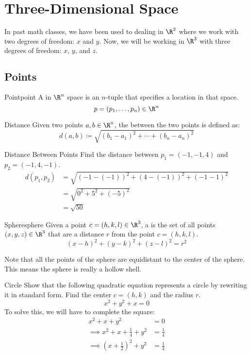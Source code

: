 \chapter{Three-Dimensional Space}
In past math classes, we have been used to dealing in $\R^2$ where we work with two degrees of freedom: $x$ and $y$. Now, we will be working in $\R^3$ with three degrees of freedom: $x$, $y$, and $z$.

\section{Points}

\begin{dfnbox}{Point}{point}
    A  in $\R^n$ space is an $n$-tuple that specifies a location in that space.
    \tcblower
    \[ p = (p_1, \ldots, p_n) \in \R^n \]
\end{dfnbox}

\begin{dfnbox}{Distance}{}
    Given two points $a, b\in \R^n$, the  between the two points is defined as:
    \[ d(a, b) \coloneq \sqrt{ (b_1 - a_1)^2 + \cdots + (b_n - a_n)^2} \]
\end{dfnbox}

\begin{exbox}{Distance Between Points}{}
    Find the distance between $p_1 = (-1, -1, 4)$ and $p_2 = (-1, 4, -1)$.
    \tcblower
    \begin{align*}
         d(p_1, p_2) &= \sqrt{ (-1-(-1))^2 + (4-(-1))^2 + (-1-1)^2 } \\
         &= \sqrt{ 0^2 + 5^2 + (-5)^2 } \\
         &= \sqrt{ 50 }
    \end{align*}
\end{exbox}

\begin{dfnbox}{Sphere}{sphere}
    Given a point $c = (h, k, l) \in \R^3$, a  is the set of all points $(x,y,z) \in \R^3$ that are a distance $r$ from the point $c = (h,k,l)$.
    \tcblower
    \[ (x-h)^2 + (y-k)^2 + (z-l)^2 = r^2 \]
\end{dfnbox}

Note that all the points of the sphere are equidistant to the center of the sphere. This means the sphere is really a hollow shell.

\begin{exbox}{Circle}{}
    Show that the following quadratic equation represents a circle by rewriting it in standard form. Find the center $c = (h,k)$ and the radius $r$.
    \[ x^2 + y^2 + x = 0 \]
    \tcblower
    To solve this, we will have to complete the square:
    \begin{align*}
        x^2 + x + y^2 &= 0 \\
        \implies x^2 + x + \frac{1}{4} + y^2 &= \frac{1}{4} \\
        \implies \left( x + \frac12 \right)^2 + y^2 &= \frac14
    \end{align*}
\end{exbox}


